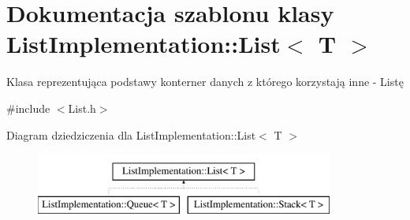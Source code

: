 \hypertarget{class_list_implementation_1_1_list}{\section{Dokumentacja szablonu klasy List\-Implementation\-:\-:List$<$ T $>$}
\label{class_list_implementation_1_1_list}
}


Klasa reprezentująca podstawy konterner danych z którego korzystają inne -\/ Listę  




{\ttfamily \#include $<$List.\-h$>$}

Diagram dziedziczenia dla List\-Implementation\-:\-:List$<$ T $>$\begin{figure}[H]
\begin{center}
\leavevmode
\includegraphics[height=2.000000cm]{class_list_implementation_1_1_list}
\end{center}
\end{figure}
